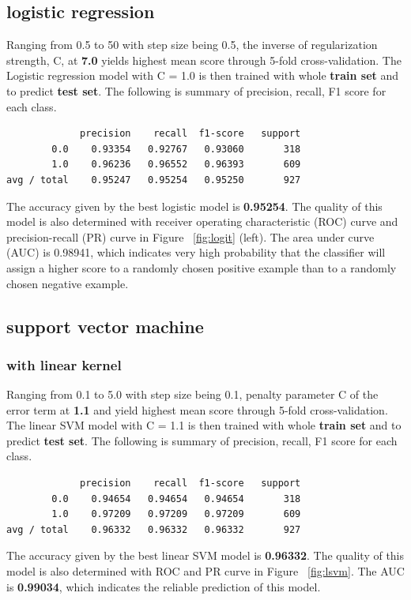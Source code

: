 \documentclass{article}
\begin{document}
\begin{singlespacing}
\subsection{logistic regression}
Ranging from 0.5 to 50 with step size being 0.5, the inverse of regularization strength, C, at \textbf{7.0} yields highest mean score through 5-fold cross-validation. The Logistic regression model with C = 1.0 is then trained with  whole \textbf{train set} and to predict \textbf{test set}. The following is summary of precision, recall, F1 score for each class.
\begin{lstlisting}
             precision    recall  f1-score   support
        0.0    0.93354   0.92767   0.93060       318
        1.0    0.96236   0.96552   0.96393       609
avg / total    0.95247   0.95254   0.95250       927
\end{lstlisting}
The accuracy given by the best logistic model is \textbf{0.95254}. The quality of this model is also determined with receiver operating characteristic (ROC) curve and precision-recall (PR) curve in Figure ~\ref{fig:logit} (left). The area under curve (AUC) is 0.98941, which indicates very high probability that the classifier will assign a higher score to a randomly chosen positive example than to a randomly chosen negative example.

\subsection{support vector machine}
\subsubsection{with linear kernel}
Ranging from 0.1 to 5.0 with step size being 0.1, penalty parameter C of the error term at \textbf{1.1} and yield highest mean score through 5-fold cross-validation. The linear SVM model with C = 1.1 is then trained with  whole \textbf{train set} and to predict \textbf{test set}. The following is summary of precision, recall, F1 score for each class.
\begin{lstlisting}
             precision    recall  f1-score   support
        0.0    0.94654   0.94654   0.94654       318
        1.0    0.97209   0.97209   0.97209       609
avg / total    0.96332   0.96332   0.96332       927
\end{lstlisting}
The accuracy given by the best linear SVM model is \textbf{0.96332}. The quality of this model is also determined with ROC and PR curve in Figure ~\ref{fig:lsvm}. The AUC is \textbf{0.99034}, which indicates the reliable prediction of this model.



\end{singlespacing}
\end{document}
